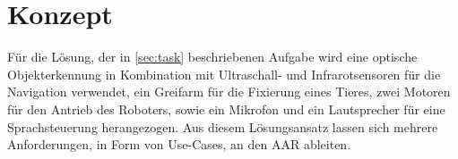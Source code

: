 \section{Konzept}

Für die Lösung, der in \autoref{sec:task} beschriebenen Aufgabe wird eine optische Objekterkennung in Kombination mit Ultraschall- und Infrarotsensoren für die Navigation verwendet, ein Greifarm für die Fixierung eines Tieres, zwei Motoren für den Antrieb des Roboters, sowie ein Mikrofon und ein Lautsprecher für eine Sprachsteuerung herangezogen.
Aus diesem Lösungsansatz lassen sich mehrere Anforderungen, in Form von Use-Cases, an den \ac{AAR} ableiten.
